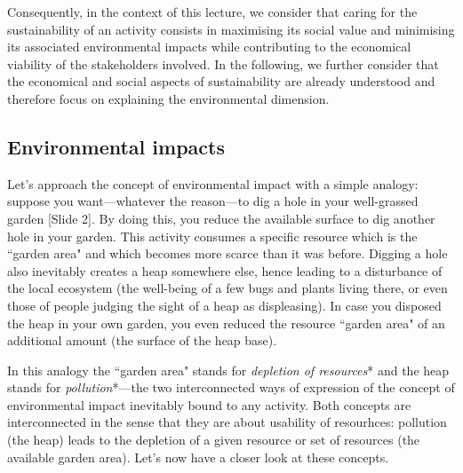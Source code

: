 \documentclass{article}
\begin{document}
Consequently, in the context of this lecture, we consider that caring for the sustainability of an activity consists in maximising its social value and minimising its associated environmental impacts while contributing to the economical viability of the stakeholders involved. In the following, we further consider that the economical and social aspects of sustainability are already understood and therefore focus on explaining the environmental dimension. 

\subsection{Environmental impacts}
\label{sec:EnvironmentalImpacts}

Let's approach the concept of environmental impact with a simple analogy: suppose you want---whatever the reason---to dig a hole in your well-grassed garden {\color{blue}[Slide 2]}. By doing this, you reduce the available surface to dig another hole in your garden. This activity consumes a specific resource which is the ``garden area" and which becomes more scarce than it was before. Digging a hole also inevitably creates a heap somewhere else, hence leading to a disturbance of the local ecosystem (the well-being of a few bugs and plants living there, or even those of people judging the sight of a heap as displeasing). In case you disposed the heap in your own garden, you even reduced the resource ``garden area" of an additional amount (the surface of the heap base). 

In this analogy the ``garden area" stands for \emph{depletion of resources}* and the heap stands for \emph{pollution}*---the two interconnected ways of expression of the concept of environmental impact inevitably bound to any activity. Both concepts are interconnected in the sense that they are about usability of resourhces: pollution (the heap) leads to the depletion of a given resource or set of resources (the available garden area).  Let's now have a closer look at these concepts.
\end{document}
